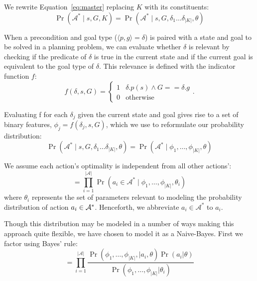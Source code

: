 \documentclass[conference]{IEEEtran}
\begin{document}
We rewrite Equation~\ref{eq:master} replacing $K$ with its constituents:
\begin{equation}
\Pr(\mathcal{A}^* \mid s, G, K) = \Pr(\mathcal{A}^* \mid s, G, \delta_1 \ldots \delta_{|K|}, \theta)
\end{equation}

When a precondition and goal type ($\langle p , g \rangle = \delta$) is paired with a
state and goal to be solved in a planning problem, we can evaluate whether $\delta$ is relevant by checking if the predicate of $\delta$ is true in the current state
and if the current goal is equivalent to the goal type of $\delta$. This relevance is defined with the indicator function $f$:
\begin{equation}
f(\delta, s, G) = 
\begin{cases}
1& \delta.p(s) \wedge G == \delta.g \\
0& \text{otherwise}
\end{cases}.
\label{eq:f_func_def}
\end{equation}

Evaluating f for each $\delta_j$ given the current state and goal gives rise to a set of binary features,
$\phi_j = f(\delta_j, s, G)$, which we use to reformulate our probability distribution:
\begin{equation}
\Pr(\mathcal{A}^* \mid s, G, \delta_1 \ldots \delta_{|K|}, \theta) = \Pr(\mathcal{A}^* \mid \phi_1, \ldots, \phi_{|K|}, \theta)
\label{eq:feature_rep}
\end{equation}

We assume each action's optimality is independent from all other actions':
\begin{equation}
= \prod_{i=1}^{|\mathcal{A}|} \Pr(a_i \in \mathcal{A}^* \mid \phi_1, \ldots, \phi_{|K|}, \theta_i)
\label{eq:action_independ}
\end{equation}
where $\theta_i$ represents the set of parameters relevant to modeling the probability
distribution of action $a_i \in {\cal A}^*$. Henceforth, we abbreviate $a_i \in \mathcal{A}^*$ to $a_i$.

Though this distribution may be modeled in a number of ways making this approach quite flexible, we have chosen to model it as a Naive-Bayes. 
First we factor using Bayes' rule:
\begin{equation}
= \prod_{i=1}^{|\mathcal{A}|} \frac{\Pr(\phi_1, \ldots, \phi_{|K|}, \mid a_i, \theta) \Pr(a_i | \theta)}{\Pr(\phi_1, \ldots, \phi_{|K|} | \theta_i)}
\label{eq:bayes}
\end{equation}
\end{document}

